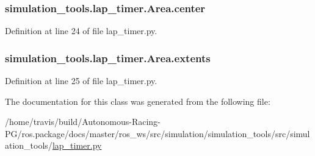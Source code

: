 \subsubsection[{\texorpdfstring{center}{center}}]{\setlength{\rightskip}{0pt plus 5cm}simulation\+\_\+tools.\+lap\+\_\+timer.\+Area.\+center}\hypertarget{classsimulation__tools_1_1lap__timer_1_1_area_ab6d54ce6f15f7931e2c97c418ef275ec}{}\label{classsimulation__tools_1_1lap__timer_1_1_area_ab6d54ce6f15f7931e2c97c418ef275ec}


Definition at line 24 of file lap\+\_\+timer.\+py.

\subsubsection[{\texorpdfstring{extents}{extents}}]{\setlength{\rightskip}{0pt plus 5cm}simulation\+\_\+tools.\+lap\+\_\+timer.\+Area.\+extents}\hypertarget{classsimulation__tools_1_1lap__timer_1_1_area_a5a876b3d7c79ddb803e0e66d851c8c4d}{}\label{classsimulation__tools_1_1lap__timer_1_1_area_a5a876b3d7c79ddb803e0e66d851c8c4d}


Definition at line 25 of file lap\+\_\+timer.\+py.



The documentation for this class was generated from the following file\+:\begin{DoxyCompactItemize}
\item 
/home/travis/build/\+Autonomous-\/\+Racing-\/\+P\+G/ros.\+package/docs/master/ros\+\_\+ws/src/simulation/simulation\+\_\+tools/src/simulation\+\_\+tools/\hyperlink{lap__timer_8py}{lap\+\_\+timer.\+py}\end{DoxyCompactItemize}
